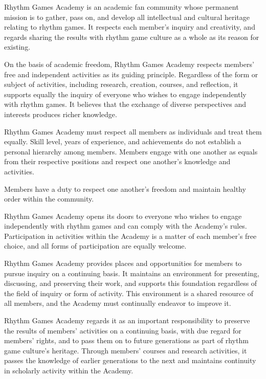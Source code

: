 \begin{articles}
  \item Rhythm Games Academy is an academic fan community whose permanent mission is to gather, pass on, and develop all intellectual and cultural heritage relating to rhythm games. It respects each member's inquiry and creativity, and regards sharing the results with rhythm game culture as a whole as its reason for existing.
  \item On the basis of academic freedom, Rhythm Games Academy respects members' free and independent activities as its guiding principle. Regardless of the form or subject of activities, including research, creation, courses, and reflection, it supports equally the inquiry of everyone who wishes to engage independently with rhythm games. It believes that the exchange of diverse perspectives and interests produces richer knowledge.
  \item Rhythm Games Academy must respect all members as individuals and treat them equally. Skill level, years of experience, and achievements do not establish a personal hierarchy among members. Members engage with one another as equals from their respective positions and respect one another's knowledge and activities.
  \begin{paragraphs}
    \item Members have a duty to respect one another's freedom and maintain healthy order within the community.
  \end{paragraphs}
  \item Rhythm Games Academy opens its doors to everyone who wishes to engage independently with rhythm games and can comply with the Academy's rules. Participation in activities within the Academy is a matter of each member's free choice, and all forms of participation are equally welcome.
  \item Rhythm Games Academy provides places and opportunities for members to pursue inquiry on a continuing basis. It maintains an environment for presenting, discussing, and preserving their work, and supports this foundation regardless of the field of inquiry or form of activity. This environment is a shared resource of all members, and the Academy must continually endeavor to improve it.
  \item Rhythm Games Academy regards it as an important responsibility to preserve the results of members' activities on a continuing basis, with due regard for members' rights, and to pass them on to future generations as part of rhythm game culture's heritage. Through members' courses and research activities, it passes the knowledge of earlier generations to the next and maintains continuity in scholarly activity within the Academy.

\end{articles}
